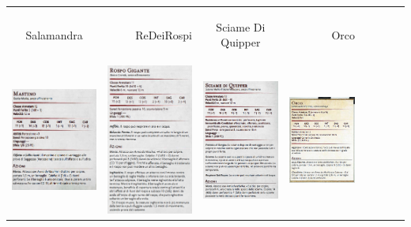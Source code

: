\documentclass{article}
\begin{document}
\begin{table}
\begin{tabular}{|cr|cr|cr|cr|}
        \hline
        Salamandra & \hypertarget{re}{ReDeiRospi} &  \hypertarget{sciame}{Sciame Di Quipper} & \hypertarget{orco}{Orco}\\
        \includegraphics[width=4cm, height = 6 cm]{../Mostri/Mastino.PNG} & \includegraphics[width=4cm, height = 6 cm]{../Mostri/ReDeiRospi.PNG} &  \includegraphics[width=4cm, height = 6 cm]{../Mostri/Sciame di Quippers.PNG} & \includegraphics[width=4cm, height = 6 cm]{../Mostri/Orco.PNG}\\

\end{tabular}
\end{table}
\end{document}
